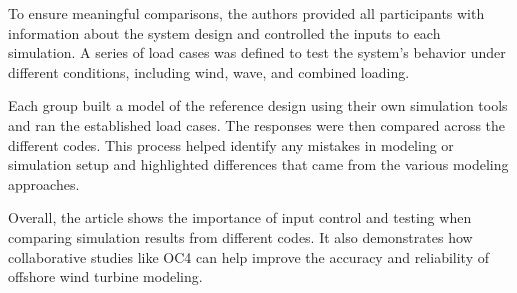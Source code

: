 \documentclass[a4paper, 11pt]{article}
\begin{document}
To ensure meaningful comparisons, the authors provided all participants with information about the system design and controlled the inputs to each simulation. A series of load cases was defined to test the system’s behavior under different conditions, including wind, wave, and combined loading.

Each group built a model of the reference design using their own simulation tools and ran the established load cases. The responses were then compared across the different codes. This process helped identify any mistakes in modeling or simulation setup and highlighted differences that came from the various modeling approaches.

Overall, the article shows the importance of input control and testing when comparing simulation results from different codes. It also demonstrates how collaborative studies like OC4 can help improve the accuracy and reliability of offshore wind turbine modeling.
\vspace{0.5cm}
\end{document}
